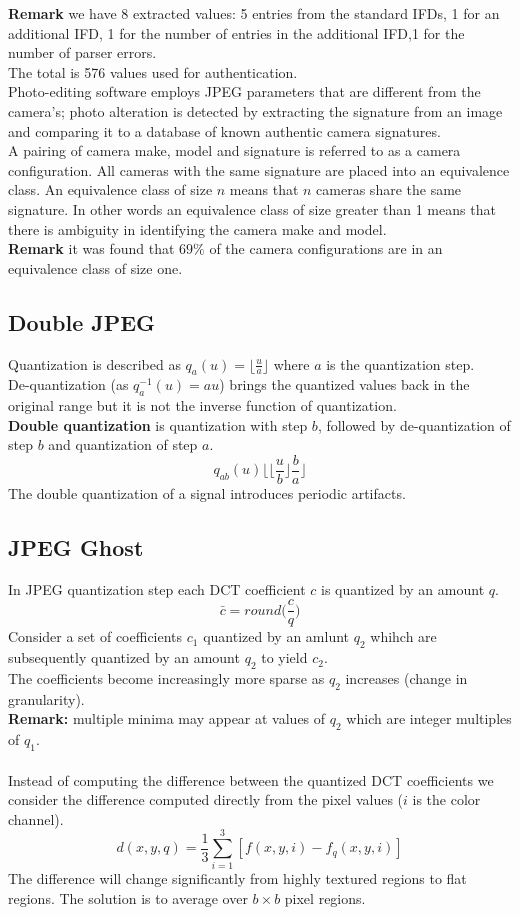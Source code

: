 \documentclass[10pt,a4paper]{book}
\begin{document}
\textbf{Remark} we have 8 extracted values: 5 entries from the standard IFDs, 1 for an additional IFD, 1 for the number of entries in the additional IFD,1 for the number of parser errors.\\
The total is 576 values used for authentication.\\
Photo-editing software employs JPEG parameters that are different from the camera's; photo alteration is detected by extracting the signature from an image and comparing it to a database of known authentic camera signatures.\\
A pairing of camera make, model and signature is referred to as a camera configuration. All cameras with the same signature are placed into an equivalence class. An equivalence class of size $n$ means that $n$ cameras share the same signature. In other words an equivalence class of size greater than 1 means that there is ambiguity in identifying the camera make and model.\\
\textbf{Remark} it was found that $69\%$ of the camera configurations are in an equivalence class of size one.
\subsection{Double JPEG}
Quantization is described as $q_a(u) = \lfloor \frac{u}{a}\rfloor$ where $a$ is the quantization step.\\
De-quantization (as $q_a^{-1}(u) = au$) brings the quantized values back in the original range but it is not the inverse function of quantization.\\
\textbf{Double quantization} is quantization with step $b$, followed by de-quantization of step $b$ and quantization of step $a$.\\
$$ q_{ab}(u) \bigg \lfloor \bigg \lfloor \frac{u}{b} \bigg \rfloor \frac{b}{a} \bigg \rfloor $$
The double quantization of a signal introduces periodic artifacts.
\subsection{JPEG Ghost}
In JPEG quantization step each DCT coefficient $c$ is quantized by an amount $q$.
$$ \bar c = round \bigg (\frac{c}{q} \bigg )$$
Consider a set of coefficients $c_1$ quantized by an amlunt $q_2$ whihch are subsequently quantized by an amount $q_2$ to yield $c_2$.\\
The coefficients become increasingly more sparse as $q_2$ increases (change in granularity).\\
\textbf{Remark:} multiple minima may appear at values of $q_2$ which are integer multiples of $q_1$.\\\\
Instead of computing the difference between the quantized DCT coefficients we consider the difference computed directly from the pixel values ($i$ is the color channel).
$$ d(x,y,q) = \frac{1}{3} \sum_{i=1}^3[f(x,y,i)-f_q(x,y,i)]$$
The difference will change significantly from highly textured regions to flat regions. The solution is to average over $b \times b$ pixel regions.
\end{document}
